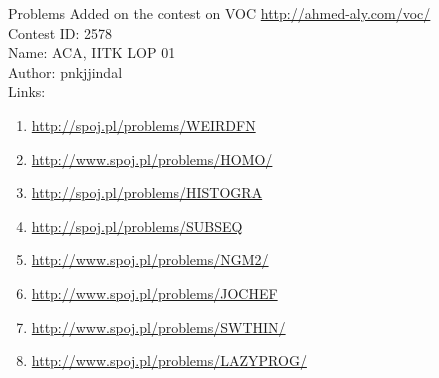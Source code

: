 \documentclass{beamer}
\begin{document}
\begin{frame}{Problems}
Added on the contest on VOC \url{http://ahmed-aly.com/voc/} \\
Contest ID: 2578 \\
Name: ACA, IITK LOP 01 \\
Author: pnkjjindal\\

Links:
\begin{enumerate}
\item \url{http://spoj.pl/problems/WEIRDFN}
\item \url{http://www.spoj.pl/problems/HOMO/}
\item \url{http://spoj.pl/problems/HISTOGRA}
\item \url{http://spoj.pl/problems/SUBSEQ}
\item \url{http://www.spoj.pl/problems/NGM2/}
\item \url{http://www.spoj.pl/problems/JOCHEF}
\item \url{http://www.spoj.pl/problems/SWTHIN/}
\item \url{http://www.spoj.pl/problems/LAZYPROG/}
\end{enumerate}
\end{frame}
\end{document}
